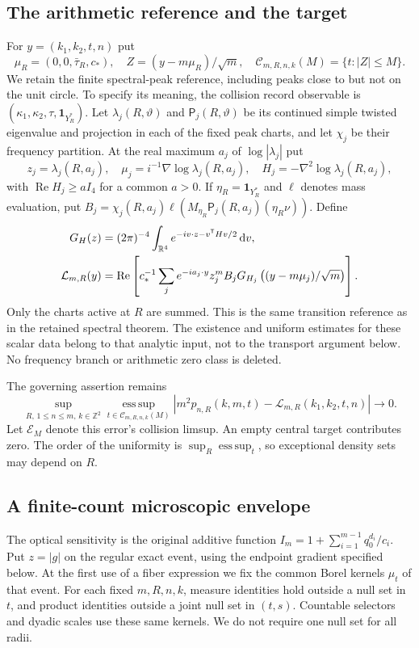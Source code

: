 \documentclass[11pt,reqno]{amsart}
\numberwithin{equation}{section}
\theoremstyle{definition}
\theoremstyle{remark}\newtheorem{remark}[theorem]{Remark}
\newcommand{\R}{\mathbb R}\newcommand{\Z}{\mathbb Z}
\newcommand{\one}{\mathbf1}\newcommand{\dd}{\,\mathrm d}
\newcommand{\esssup}{\operatorname*{ess\,sup}}
\begin{document}
\subsection{The arithmetic reference and the target}
For $y=(k_1,k_2,t,n)$ put
\[
 \mu_R=(0,0,\bar\tau_R,c_*),\quad
 Z=(y-m\mu_R)/\sqrt m,\quad
 \mathcal C_{m,R,n,k}(M)=\{t:|Z|\le M\}.
\]
We retain the finite spectral-peak reference, including peaks close to
but not on the unit circle. To specify its meaning, the collision
record observable is $(\kappa_1,\kappa_2,\tau,\one_{Y_R^*})$.
Let $\lambda_j(R,\vartheta)$ and $\mathsf P_j(R,\vartheta)$ be its
continued simple twisted eigenvalue and projection in each of the
fixed peak charts, and let $\chi_j$ be their frequency partition.
At the real maximum $a_j$ of $\log|\lambda_j|$ put
\[
 z_j=\lambda_j(R,a_j),\quad
 \mu_j=i^{-1}\nabla\log\lambda_j(R,a_j),\quad
 H_j=-\nabla^2\log\lambda_j(R,a_j),
\]
with $\operatorname{Re}H_j\ge aI_4$ for a common $a>0$. If
$\eta_R=\one_{Y_R^*}$ and $\ell$ denotes mass evaluation, put
$B_j=\chi_j(R,a_j)\ell(M_{\eta_R}\mathsf P_j(R,a_j)(\eta_R\nu))$.
Define
\begin{align}
 G_H(z)&=(2\pi)^{-4}\int_{\R^4}e^{-iv\cdot z-v^{\mathsf T}Hv/2}\dd v,
 \notag\\
 \mathcal L_{m,R}(y)&=\operatorname{Re}\left[
 c_*^{-1}\sum_j e^{-ia_j\cdot y}z_j^m B_j
      G_{H_j}\left((y-m\mu_j)/\sqrt m\right)\right].
 \label{eq:v76-reference}
\end{align}
Only the charts active at $R$ are summed. This is the same transition
reference as in the retained spectral theorem. The existence and
uniform estimates for these scalar data belong to that analytic
input, not to the transport argument below. No frequency branch or
arithmetic zero class is deleted.

The governing assertion remains
\begin{equation}\label{eq:v76-target}
 \sup_{R,\,1\le n\le m,\,k\in\Z^2}
 \esssup_{t\in\mathcal C_{m,R,n,k}(M)}
 |m^2p_{n,R}(k,m,t)-\mathcal L_{m,R}(k_1,k_2,t,n)|\longrightarrow0.
\end{equation}
Let $\mathcal E_M$ denote this error's collision limsup. An empty
central target contributes zero. The order of the uniformity is
$\sup_R\esssup_t$, so exceptional density sets may depend on $R$.

\subsection{A finite-count microscopic envelope}
The optical sensitivity is the original additive function
$I_m=1+\sum_{i=1}^{m-1}q_0^{d_i}/c_i$. Put $z=|g|$ on the
regular exact event, using the endpoint gradient specified below.
At the first use of a fiber expression we fix the common Borel kernels
$\mu_t$ of that event. For each fixed $m,R,n,k$, measure identities
hold outside a null set in $t$, and product identities outside a joint
null set in $(t,s)$. Countable selectors and dyadic scales use these
same kernels. We do not require one null set for all radii.
\end{document}
